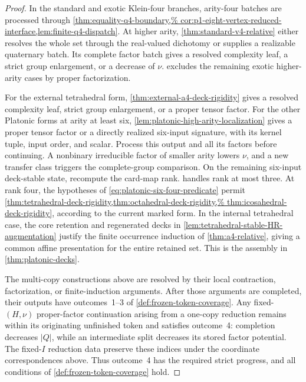 \documentclass[11pt,letterpaper,onecolumn]{article}
\theoremstyle{plain}
\theoremstyle{definition}
\theoremstyle{remark}
\begin{document}
\begin{proof}
In the standard and exotic Klein-four branches, arity-four batches are
processed through \cref{thm:equality-q4-boundary,%
cor:p1-eight-vertex-reduced-interface,lem:finite-q4-dispatch}.
At higher arity, \cref{thm:standard-v4-relative} either resolves the whole
set through the real-valued dichotomy or supplies a realizable quaternary
batch. Its complete factor batch gives a resolved complexity leaf, a strict
group enlargement, or a decrease of \(\nu\).
 excludes the remaining exotic
higher-arity cases by proper factorization.

For the external tetrahedral form,
\cref{thm:external-a4-deck-rigidity} gives a resolved complexity leaf,
strict group enlargement, or a proper tensor factor. For the other
Platonic forms at arity at least six,
\cref{lem:platonic-high-arity-localization} gives a proper
tensor factor or a directly realized six-input signature, with its kernel
tuple, input order, and scalar. Process this output and all its factors
before continuing. A nonbinary irreducible factor of smaller arity lowers
\(\nu\), and a new transfer class triggers the complete-group comparison.
On the remaining six-input deck-stable state, recompute the card-map rank.
 handles rank at most three.
At rank four, the hypotheses of \cref{eq:platonic-six-four-predicate}
permit \cref{thm:tetrahedral-deck-rigidity,thm:octahedral-deck-rigidity,%
thm:icosahedral-deck-rigidity}, according to the current marked form.
In the internal tetrahedral case, the core retention and regenerated
decks in \cref{lem:tetrahedral-stable-HR-augmentation} justify the
finite occurrence induction of \cref{thm:a4-relative}, giving a common
affine presentation for the entire retained set. This is the assembly in
\cref{thm:platonic-decks}.

The multi-copy constructions above are resolved by their local
contraction, factorization, or finite-induction arguments. After those
arguments are completed, their outputs have outcomes~1--3 of
\cref{def:frozen-token-coverage}.  Any fixed-\((H,\nu)\)
proper-factor continuation arising from a one-copy reduction remains within
its originating unfinished token and satisfies outcome~4: completion
decreases \(|Q|\), while an intermediate split decreases its stored factor
potential.  The fixed-\(I\) reduction data preserve these indices under the coordinate
correspondences above. Thus outcome~4 has the required strict progress,
and all conditions of \cref{def:frozen-token-coverage} hold.
\end{proof}
\end{document}

